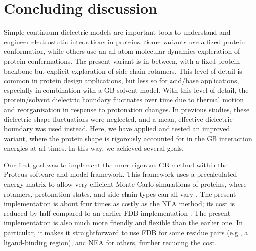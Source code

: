 \documentclass[a4paper,12pt]{article}
\begin{document}
\section{Concluding discussion}
Simple continuum dielectric models are important tools to understand and engineer electrostatic interactions in proteins.
Some variants use a fixed protein conformation, while others use an all-atom molecular dynamics exploration of protein
conformations. The present variant is in between, with a fixed protein backbone but explicit exploration of side chain
rotamers. This level of detail is common in protein design applications, but less so for acid/base applications, especially
in combination with a GB solvent model. With this level of detail, the protein/solvent dielectric boundary fluctuates over
time due to thermal motion and reorganization in response to protonation changes. In previous studies, these dielectric
shape fluctuations were neglected, and a mean, effective dielectric boundary was used instead. Here, we have applied and
tested an improved variant, where the protein shape is rigorously accounted for in the GB interaction energies at all times.
In this way, we achieved several goals.

Our first goal was to implement the more rigorous GB method within the Proteus software and model framework. This framework
uses a precalculated energy matrix to allow very efficient Monte Carlo simulations of proteins, where rotamers, protonation
states, and side chain types can all vary \cite{Simonson13,Mignon16}. The present implementation is about four times as costly
as the NEA method; its cost is reduced by half compared to an earlier FDB implementation \cite{Aleksandrov10b}. The present
implementation is also much more friendly and flexible than the earlier one. In particular, it makes it straightforward to
use FDB for some residue pairs (e.g., a ligand-binding region), and NEA for others, further reducing the cost.
\end{document}
